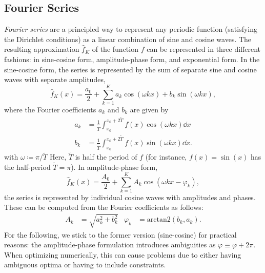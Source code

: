 \subsection{Fourier Series}
	\emph{Fourier series} are a principled way to represent any periodic function (satisfying the Dirichlet conditions\cite{oppenheimSignalsSystems1997}) as a linear combination of sine and cosine waves.
	The resulting approximation $\hat{f}_K$ of the function $f$ can be represented in three different fashions: in sine-cosine form, amplitude-phase form, and exponential form.
	In the sine-cosine form, the series is represented by the sum of separate sine and cosine waves with separate amplitudes,
	\begin{equation}
		\hat{f}_K(x) = \frac{a_0}{2} + \sum_{k = 1}^{K} a_k \cos(\omega k x) + b_k \sin(\omega k x),
		\label{eq:sineCosineFourierSeries}
	\end{equation}
	where the Fourier coefficients $a_k$ and $b_k$ are given by
	\begin{align}
		a_k &= \frac{1}{\tilde{T}} \int_{x_0}^{x_0 + 2\tilde{T}} f(x) \cos(\omega k x) \dd{x} \\
		b_k &= \frac{1}{\tilde{T}} \int_{x_0}^{x_0 + 2\tilde{T}} f(x) \sin(\omega k x) \dd{x}.
	\end{align}
	with \(\omega \coloneqq \pi / \tilde{T}\) Here, $\tilde{T}$ is half the period of $f$ (for instance, $f(x) = \sin(x)$ has the half-period $\tilde{T} = \pi$).
	In amplitude-phase form,
	\begin{equation}
		\hat{f}_K(x) = \frac{A_0}{2} + \sum_{k = 1}^{K} A_k \cos(\omega k x - \varphi_k),
	\end{equation}
	the series is represented by individual cosine waves with amplitudes and phases.
	These can be computed from the Fourier coefficients as follows:
	\begin{align}
		A_k &= \sqrt{a_k^2 + b_k^2} &
		\varphi_k &= \mathrm{arctan2}(b_k, a_k).
	\end{align}
	For the following, we stick to the former version (sine-cosine) for practical reasons:
	the amplitude-phase formulation introduces ambiguities as $\varphi \equiv \varphi + 2\pi$.
	When optimizing numerically, this can cause problems due to either having ambiguous optima or having to include constraints.


